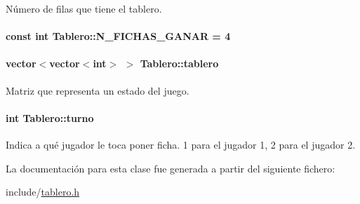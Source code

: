 Número de filas que tiene el tablero. 

\hypertarget{classTablero_aa38ed353bef45bd6c5a2e3aa4a897720}{
\paragraph[{N\-\_\-\-F\-I\-C\-H\-A\-S\-\_\-\-G\-A\-N\-A\-R}]{\setlength{\rightskip}{0pt plus 5cm}const int Tablero\-::\-N\-\_\-\-F\-I\-C\-H\-A\-S\-\_\-\-G\-A\-N\-A\-R = 4\hspace{0.3cm}{\ttfamily [static]}}}\label{classTablero_aa38ed353bef45bd6c5a2e3aa4a897720}
\hypertarget{classTablero_a5df607d108c0c0a14aa4f393b7f43030}{
\paragraph[{tablero}]{\setlength{\rightskip}{0pt plus 5cm}vector$<$vector$<$int$>$ $>$ Tablero\-::tablero\hspace{0.3cm}{\ttfamily [private]}}}\label{classTablero_a5df607d108c0c0a14aa4f393b7f43030}


Matriz que representa un estado del juego. 

\hypertarget{classTablero_ae460b4a3245da075dd381365abf158bc}{
\paragraph[{turno}]{\setlength{\rightskip}{0pt plus 5cm}int Tablero\-::turno\hspace{0.3cm}{\ttfamily [private]}}}\label{classTablero_ae460b4a3245da075dd381365abf158bc}


Indica a qué jugador le toca poner ficha. 1 para el jugador 1, 2 para el jugador 2. 



La documentación para esta clase fue generada a partir del siguiente fichero\-:\begin{DoxyCompactItemize}
\item 
include/\hyperlink{tablero_8h}{tablero.\-h}\end{DoxyCompactItemize}
